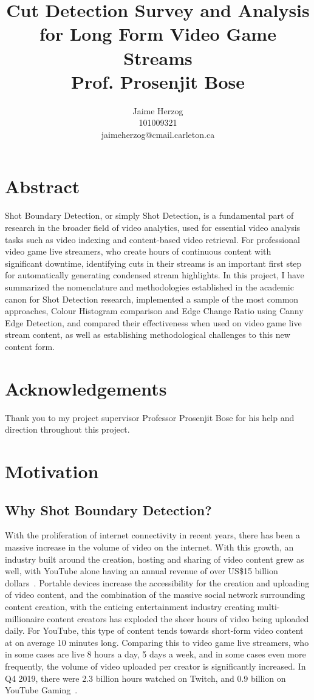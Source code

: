 \documentclass[12pt]{article}
\title{Cut Detection Survey and Analysis for Long Form Video Game Streams \\ Prof. Prosenjit Bose}
\author{Jaime Herzog\\ 101009321 \\ jaimeherzog@cmail.carleton.ca}
\begin{document}
\maketitle
\clearpage

\section{Abstract}
Shot Boundary Detection, or simply Shot Detection, is a fundamental part of research in the broader field of video analytics, used for essential video analysis tasks such as 
video indexing and content-based video retrieval. For professional video game live streamers, who create hours of continuous content with significant downtime, identifying
cuts in their streams is an important first step for automatically generating condensed stream highlights. In this project, I have summarized the nomenclature and methodologies
established in the academic canon for Shot Detection research, implemented a sample of the most common approaches, Colour Histogram comparison and Edge Change Ratio using Canny 
Edge Detection, and compared their effectiveness when used on video game live stream content, as well as establishing methodological challenges to this new content form.
\section{Acknowledgements}
Thank you to my project supervisor Professor Prosenjit Bose for his help and direction throughout this project.
\clearpage

\tableofcontents
\clearpage

\section{Motivation}
\subsection{Why Shot Boundary Detection?}
    With the proliferation of internet connectivity in recent years, there has been a massive increase in the volume of video on the internet.
With this growth, an industry built around the creation, hosting and sharing of video content grew as well, with YouTube alone having an annual revenue of over US\$15 billion
dollars~\cite{youtube}. Portable devices increase the accessibility for the creation and uploading of video content, and the combination of the 
massive social network surrounding content creation, with the enticing entertainment industry creating multi-millionaire content creators has 
exploded the sheer hours of video being uploaded daily. For YouTube, this type of content tends towards short-form video content at on average 10 minutes long. Comparing
this to video game live streamers, who in some cases are live 8 hours a day, 5 days a week, and in some cases even more frequently, the volume of video uploaded
per creator is significantly increased. In Q4 2019, there were 2.3 billion hours watched on Twitch, and 0.9 billion on YouTube Gaming~\cite{twitchusage}. 
\end{document}
